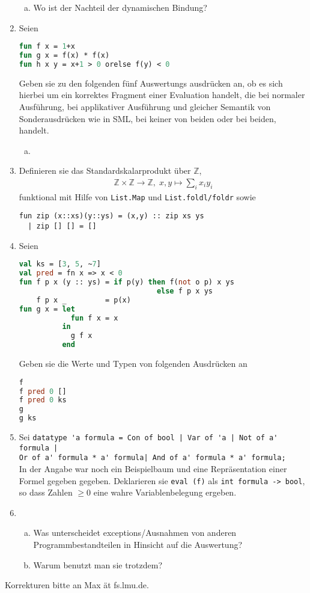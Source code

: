 \documentclass{article}
\begin{document}
\begin{enumerate}[1)]
\begin{enumerate}[a)]
      \item  Wo ist der Nachteil der dynamischen Bindung?
    \end{enumerate}
  \item 
    Seien 
 \begin{lstlisting}[language=ML]
fun f x = 1+x
fun g x = f(x) * f(x)
fun h x y = x+1 > 0 orelse f(y) < 0
    \end{lstlisting}
    Geben sie zu den folgenden fünf Auswertungs ausdrücken an, ob es sich hierbei um ein korrektes Fragment einer Evaluation handelt, die bei normaler Ausführung, bei applikativer Ausführung und gleicher Semantik von Sonderausdrücken wie in SML, bei keiner von beiden oder bei beiden, handelt.
    \begin{enumerate}[a)]
      \item 
    \end{enumerate}
  \item Definieren sie das Standardskalarprodukt über $\mathbb Z$, 
    \begin{align*}
      \mathbb Z \times \mathbb Z\to \mathbb Z, \; x,y \mapsto \sum_i x_i y_i
    \end{align*}
    funktional mit Hilfe von \verb|List.Map| und \verb|List.foldl/foldr| sowie 
    \begin{lstlisting}
fun zip (x::xs)(y::ys) = (x,y) :: zip xs ys
  | zip [] [] = []
    \end{lstlisting}
\item 
 Seien
 \begin{lstlisting}[language=ML]
val ks = [3, 5, ~7]
val pred = fn x => x < 0
fun f p x (y :: ys) = if p(y) then f(not o p) x ys
                                else f p x ys
    f p x _         = p(x) 
fun g x = let 
            fun f x = x
          in 
            g f x 
          end
\end{lstlisting}
  Geben sie die Werte und Typen von folgenden Ausdrücken an
\begin{lstlisting}[language=ML]
f
f pred 0 []
f pred 0 ks
g 
g ks
\end{lstlisting}
\item 
  Sei \verb/datatype 'a formula = Con of bool | Var of 'a | Not of a' formula |/\\
  \verb/Or of a' formula * a' formula| And of a' formula * a' formula;/\\
  In der Angabe war noch ein Beispielbaum und eine Repräsentation einer Formel gegeben gegeben.
  Deklarieren sie \verb|eval (f)| als \verb|int formula -> bool|, so dass Zahlen $\geq 0$ eine wahre Variablenbelegung ergeben.
\item 
  \begin{enumerate}[a)]
    \item Was unterscheidet exceptions/Ausnahmen von anderen Programmbestandteilen in Hinsicht auf die Auswertung?
    \item Warum benutzt man sie trotzdem?
  \end{enumerate}
\end{enumerate}
Korrekturen bitte an Max ät fs.lmu.de.
\end{document}
